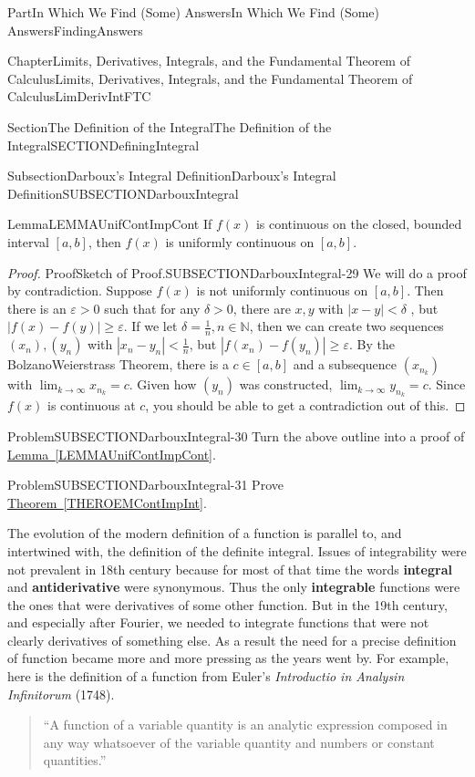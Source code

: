 \documentclass[oneside,10pt,]{book}
\newcommand{\xreffont}{\relax}
\newcommand{\terminology}[1]{\textbf{#1}}
\newcommand{\pubtitle}[1]{\textsl{#1}}
\numberwithin{equation}{part}
\def\limit#1#2#3{{\displaystyle\lim_{#1\rightarrow #2}#3}}
\newcommand{\eps}{\varepsilon}
\newcommand{\lt}{<}
\begin{document}
\begin{partptx}{Part}{In Which We Find (Some) Answers}{}{In Which We Find (Some) Answers}{}{}{FindingAnswers}
\begin{chapterptx}{Chapter}{Limits, Derivatives, Integrals, and the Fundamental Theorem of Calculus}{}{Limits, Derivatives, Integrals, and the Fundamental Theorem of Calculus}{}{}{LimDerivIntFTC}
\begin{sectionptx}{Section}{The Definition of the Integral}{}{The Definition of the Integral}{}{}{SECTIONDefiningIntegral}
\begin{subsectionptx}{Subsection}{Darboux's Integral Definition}{}{Darboux's Integral Definition}{}{}{SUBSECTIONDarbouxIntegral}
\begin{lemma}{Lemma}{}{}{LEMMAUnifContImpCont}
If \(f(x)\) is continuous on the closed, bounded interval \([a,b]\), then \(f(x)\) is uniformly continuous on \([a,b]\).%
\end{lemma}
\begin{proof}{Proof}{Sketch of Proof.}{SUBSECTIONDarbouxIntegral-29}
We will do a proof by contradiction.  Suppose \(f(x)\) is not uniformly continuous on \([a,b]\).  Then there is an \(\eps
>0\) such that for any \(\delta >0\), there are \(x,y\) with \(\left|x-y\right|\lt \delta \) , but \(\left|f\left(x\right)-f\left(y\right)\right|\ge \eps \).  If we let \(\delta =\frac{1}{n}, n\in \mathbb{N}\), then we can create two sequences \(\left(x_n\right), (y_n)\) with \(\left|x_n-y_n\right|\lt \frac{1}{n}\), but \(\left|f\left(x_n\right)-f\left(y_n\right)\right|\ge \eps .\) By the Bolzano\textendash{}Weierstrass Theorem, there is a \(c\in [a,b]\) and a subsequence \((x_{n_k})\) with \(\limit{k}{\infty }{ x_{n_k} }=c\).  Given how \((y_n)\) was constructed, \(\limit{k}{\infty }{ y_{n_k} }=c\).  Since \(f(x)\) is continuous at \(c\), you should be able to get a contradiction out of this.%
\end{proof}
\begin{problem}{Problem}{}{SUBSECTIONDarbouxIntegral-30}%
Turn the above outline into a proof of \hyperref[LEMMAUnifContImpCont]{Lemma~{\xreffont\ref{LEMMAUnifContImpCont}}}.%
\end{problem}
\begin{problem}{Problem}{}{SUBSECTIONDarbouxIntegral-31}%
Prove \hyperref[THEROEMContImpInt]{Theorem~{\xreffont\ref{THEROEMContImpInt}}}.%
\end{problem}
The evolution of the modern definition of a function is parallel to, and intertwined with, the definition of the definite integral.  Issues of integrability were not prevalent in 18th century because for most of that time the words \terminology{integral} and \terminology{antiderivative} were synonymous. Thus the only \terminology{integrable} functions were the ones that were derivatives of some other function. But in the 19th century, and especially after Fourier, we needed to integrate functions that were not clearly derivatives of something else. As a result the need for a precise definition of function became more and more pressing as the years went by.  For example, here is the definition of a function from Euler's \pubtitle{\textit{Introductio in Analysin Infinitorum}} (1748).%
\begin{quote}%
``A function of a variable quantity is an analytic expression composed in any way whatsoever of the variable quantity and numbers or constant quantities.''%

\end{quote}
\end{subsectionptx}
\end{sectionptx}
\end{chapterptx}
\end{partptx}
\end{document}

